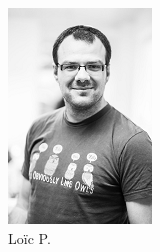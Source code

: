 \begin{figure}[h!]
\begin{subfigure}[b]{0.2\textwidth}
                \includegraphics[width=\textwidth]{images/loic-serieux.png}
                \caption{Loïc P.}
            \end{subfigure}
            \begin{subfigure}[b]{0.2\textwidth}

\end{subfigure}
\end{figure}
